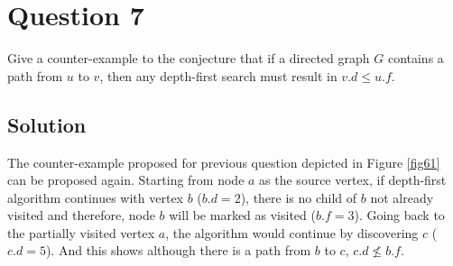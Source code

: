
\section*{Question 7}

Give a counter-example to the conjecture that if a directed graph $G$ contains a path from $u$ to $v$, then any depth-first search must result in $v.d \leq u.f$.

\subsection*{Solution}

The counter-example proposed for previous question depicted in Figure \ref{fig61} can be proposed again. Starting from node $a$ as the source vertex, if depth-first algorithm continues with vertex $b$ ($b.d = 2$), there is no child of $b$ not already visited and therefore, node $b$ will be marked as visited ($b.f = 3 $). Going back to the partially visited vertex $a$, the algorithm would continue by discovering $c$ ($c.d = 5$). And this shows although there is a path from $b$ to $c$, $c.d \nleq b.f$.
